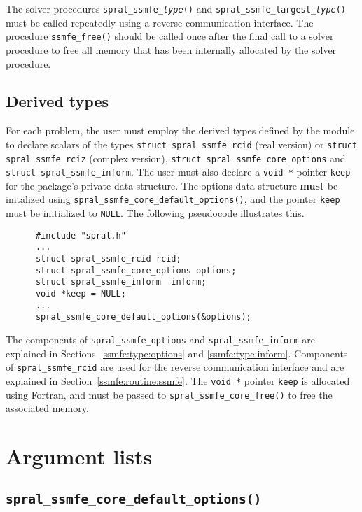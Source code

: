 \noindent
The solver procedures \texttt{spral\_ssmfe\_\textit{type}()} and \texttt{spral\_ssmfe\_largest\_\textit{type}()}
must be called repeatedly using
a reverse communication interface.
The procedure \texttt{ssmfe\_free()}
should be called once after the
final call to 
a solver procedure
to free all memory that has been internally
allocated by
the solver procedure.

\subsection{Derived types}
\label{sec:derived}

For each problem, the user must employ the derived types defined by the
module to declare scalars of the types 
{\tt struct spral\_ssmfe\_rcid} (real version) or 
{\tt struct spral\_ssmfe\_rciz} (complex version), 
{\tt struct spral\_ssmfe\_core\_options} and 
{\tt struct spral\_ssmfe\_inform}. The user must also declare a \texttt{void *}
pointer \texttt{keep} for the package's private data structure. The options
data structure \textbf{must} be initalized using \texttt{spral\_ssmfe\_core\_default\_options()},
and the pointer \texttt{keep} must be initialized to \texttt{NULL}.
The following pseudocode illustrates this.
\begin{verbatim}
      #include "spral.h"
      ...
      struct spral_ssmfe_rcid rcid;
      struct spral_ssmfe_core_options options;
      struct spral_ssmfe_inform  inform;
      void *keep = NULL;
      ...
      spral_ssmfe_core_default_options(&options);
\end{verbatim}
The components of {\tt spral\_ssmfe\_options} and {\tt spral\_ssmfe\_inform} are explained
in Sections~\ref{ssmfe:type:options} and \ref{ssmfe:type:inform}. Components
of \texttt{spral\_ssmfe\_rcid} are used for the reverse communication interface and
are explained in Section~\ref{ssmfe:routine:ssmfe}.
The \texttt{void~*} pointer \texttt{keep} is allocated using Fortran, and
must be passed to \texttt{spral\_ssmfe\_core\_free()} to free the associated
memory.

\section{Argument lists}

\subsection{\texttt{spral\_ssmfe\_core\_default\_options()}}

